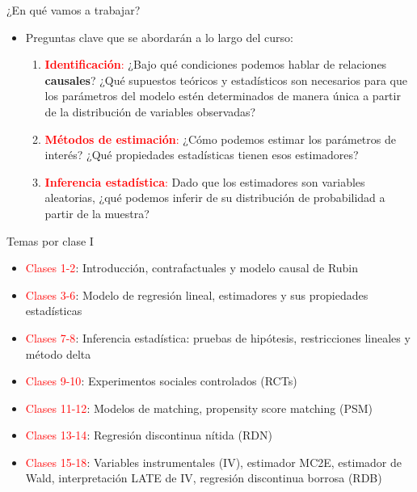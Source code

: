 \documentclass[10pt, xcolor=dvipsnames]{beamer}
\begin{document}
\begin{frame}{¿En qué vamos a trabajar?}    
\begin{itemize}
    \item Preguntas clave que se abordarán a lo largo del curso:
    \vspace{1em}
    \begin{enumerate}
        \item \textcolor{red}{\textbf{Identificación}:} ¿Bajo qué condiciones podemos hablar de relaciones \textbf{causales}? ¿Qué supuestos teóricos y estadísticos son necesarios para que los parámetros del modelo estén determinados de manera única a partir de la distribución de variables observadas?
        \vspace{1em}%
        \item \textcolor{red}{\textbf{Métodos de estimación}:} ¿Cómo podemos estimar los parámetros de interés? ¿Qué propiedades estadísticas tienen esos estimadores? 
        \vspace{1em}%
        \item \textcolor{red}{\textbf{Inferencia estadística}:} Dado que los estimadores son variables aleatorias, ¿qué podemos inferir de su distribución de probabilidad a partir de la muestra?
    \end{enumerate}
\end{itemize}
\end{frame}

\begin{frame}{Temas por clase I}
    \begin{itemize}[itemsep=0.1em, parsep=0pt]
    \item \textcolor{red}{Clases 1-2}: Introducción, contrafactuales y modelo causal de Rubin
    \item \textcolor{red}{Clases 3-6}: Modelo de regresión lineal, estimadores y sus propiedades estadísticas   
    \item \textcolor{red}{Clases 7-8}: Inferencia estadística: pruebas de hipótesis, restricciones lineales y método delta    %
    \item \textcolor{red}{Clases 9-10}: Experimentos sociales controlados (RCTs)
    \item \textcolor{red}{Clases 11-12}: Modelos de matching, propensity score matching (PSM)
    \item \textcolor{red}{Clases 13-14}: Regresión discontinua nítida (RDN)     
    \item \textcolor{red}{Clases 15-18}: Variables instrumentales (IV), estimador MC2E, estimador de Wald, interpretación LATE de IV, regresión discontinua borrosa (RDB)
\end{itemize}
\end{frame}
\end{document}
